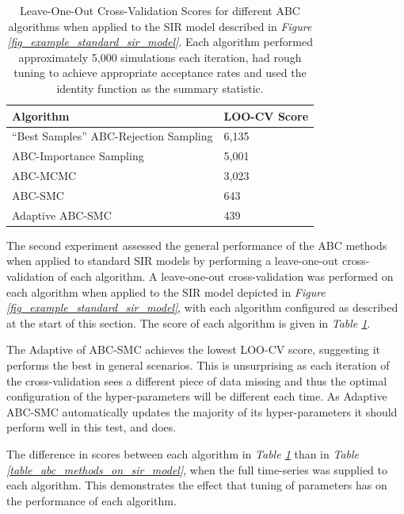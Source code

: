 \documentclass[11pt,a4paper]{article}
\theoremstyle{break}
\begin{document}
  \begin{table}[H]
    \centering
    \begin{tabular}{|l|l|}
      \hline
      \textbf{Algorithm}&\textbf{LOO-CV Score}\\\hline\hline
      ``Best Samples'' ABC-Rejection Sampling&6,135\\\hline
      ABC-Importance Sampling&5,001\\\hline
      ABC-MCMC&3,023\\\hline
      ABC-SMC&643\\\hline
      Adaptive ABC-SMC&439\\\hline
    \end{tabular}
    \caption{Leave-One-Out Cross-Validation Scores for different ABC algorithms when applied to the SIR model described in \textit{Figure \ref{fig_example_standard_sir_model}}. Each algorithm performed approximately 5,000 simulations each iteration, had rough tuning to achieve appropriate acceptance rates and used the identity function as the summary statistic.}
    \label{table_abc_methods_on_sir_model_loo_cv}
  \end{table}

  \par The second experiment assessed the general performance of the ABC methods when applied to standard SIR models by performing a leave-one-out cross-validation of each algorithm. A leave-one-out cross-validation was performed on each algorithm when applied to the SIR model depicted in \textit{Figure \ref{fig_example_standard_sir_model}}, with each algorithm configured as described at the start of this section. The score of each algorithm is given in \textit{Table \ref{table_abc_methods_on_sir_model_loo_cv}}.

  \par The Adaptive of ABC-SMC achieves the lowest LOO-CV score, suggesting it performs the best in general scenarios. This is unsurprising as each iteration of the cross-validation sees a different piece of data missing and thus the optimal configuration of the hyper-parameters will be different each time. As Adaptive ABC-SMC automatically updates the majority of its hyper-parameters it should perform well in this test, and does.

  \par The difference in scores between each algorithm in \textit{Table \ref{table_abc_methods_on_sir_model_loo_cv}} than in \textit{Table \ref{table_abc_methods_on_sir_model}}, when the full time-series was supplied to each algorithm. This demonstrates the effect that tuning of parameters has on the performance of each algorithm.
\end{document}

